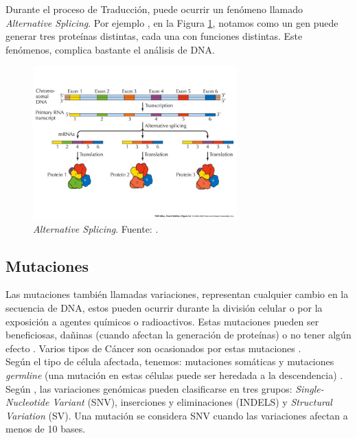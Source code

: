 Durante el proceso de Traducción, puede ocurrir un fenómeno llamado \textit{Alternative Splicing}. Por ejemplo , en la Figura \ref{img:alt}, notamos como un gen puede generar tres proteínas distintas, cada una con funciones distintas. Este fenómenos, complica bastante el análisis de DNA.


\begin{figure}[H]
	\centering
	\includegraphics[width=0.7\textwidth]{img/neoantigen/alt}
	\caption{\textit{Alternative Splicing}. Fuente:  \cite{nci2020}.}	
	\label{img:alt}
\end{figure}


\subsection{Mutaciones}

Las mutaciones también llamadas variaciones, representan cualquier cambio en la secuencia de DNA, estos pueden ocurrir durante la división celular o por la exposición a agentes químicos o radioactivos. Estas mutaciones pueden ser beneficiosas, dañinas (cuando afectan la generación de proteínas) o no tener algún efecto  \citep{NCIdictionary2022}. Varios tipos de Cáncer son ocasionados por estas mutaciones \citep{borden2022cancer, chen2021challenges, de2020neoantigen}. \\ 

Según el tipo de célula afectada, tenemos: mutaciones somáticas y mutaciones \textit{germline} (una mutación en estas células puede ser heredada a la descendencia) \citep{clancy2008genetic}.  Según \citep{xu2018review}, las variaciones genómicas pueden clasificarse en tres grupos: \textit{Single-Nucleotide Variant} (SNV), inserciones y eliminaciones (INDELS) y \textit{Structural Variation} (SV). Una mutación se considera SNV cuando las variaciones afectan a menos de 10 bases. \\

